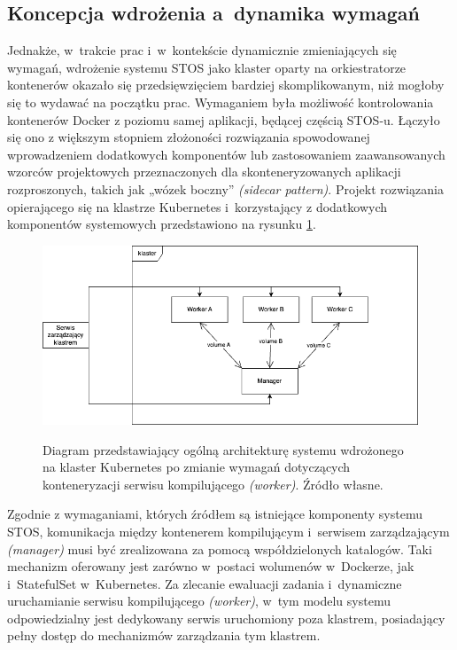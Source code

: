 \subsection{Koncepcja wdrożenia a~dynamika wymagań}
Jednakże, w~trakcie prac i~w~kontekście dynamicznie zmieniających się wymagań, wdrożenie systemu STOS jako klaster oparty na orkiestratorze kontenerów okazało się przedsięwzięciem bardziej skomplikowanym, niż mogłoby się to wydawać na początku prac. Wymaganiem była możliwość kontrolowania kontenerów Docker z poziomu samej aplikacji, będącej częścią STOS-u. Łączyło się ono z większym stopniem złożoności rozwiązania spowodowanej wprowadzeniem dodatkowych komponentów lub zastosowaniem zaawansowanych wzorców projektowych przeznaczonych dla skonteneryzowanych aplikacji rozproszonych, takich jak „wózek boczny” \textit{(sidecar pattern)}\cite{k8sPatterns}. Projekt rozwiązania opierającego się na klastrze Kubernetes i~korzystający z dodatkowych komponentów systemowych przedstawiono na rysunku \ref{diagramk8sFinal}.

\begin{figure}[!h]
	\begin{center}
		\resizebox{0.7\textwidth}{!} {
			\includegraphics{img/4/k8sFinal.png}
		}
		\caption[Diagram prototypu klastra Kubernetes po zmianie architektury]{Diagram przedstawiający ogólną architekturę systemu wdrożonego na klaster Kubernetes po zmianie wymagań dotyczących konteneryzacji serwisu kompilującego \textit{(worker)}. Źródło własne.}
		\label{diagramk8sFinal}
	\end{center}
\end{figure}

Zgodnie z wymaganiami, których źródłem są istniejące komponenty systemu STOS, komunikacja między kontenerem kompilującym i~serwisem zarządzającym \textit{(manager)} musi być zrealizowana za pomocą współdzielonych katalogów. Taki mechanizm oferowany jest zarówno w~postaci wolumenów w~Dockerze\cite{dockerVolume}, jak i~StatefulSet w~Kubernetes\cite{k8sStateful}. Za zlecanie ewaluacji zadania i~dynamiczne uruchamianie serwisu kompilującego \textit{(worker)}, w~tym modelu systemu odpowiedzialny jest dedykowany serwis uruchomiony poza klastrem, posiadający pełny dostęp do mechanizmów zarządzania tym klastrem.

